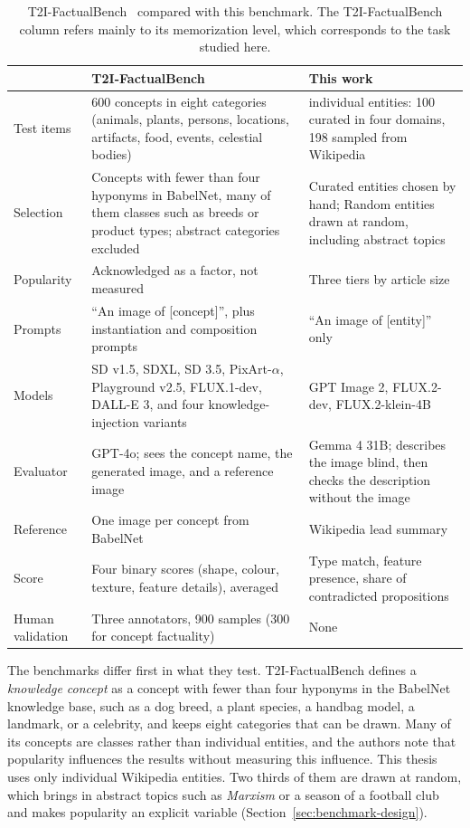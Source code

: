\begin{table}[ht]
\centering
\footnotesize
\caption{T2I-FactualBench~\citep{t2ifactualbench2025} compared with this
benchmark. The T2I-FactualBench column refers mainly to its memorization level,
which corresponds to the task studied here.}
\label{tab:t2ifactualbench}
\begin{tabular}{>{\raggedright\arraybackslash}p{2.3cm}>{\raggedright\arraybackslash}p{5.4cm}>{\raggedright\arraybackslash}p{5.4cm}}
\toprule
 & T2I-FactualBench & This work \\
\midrule
Test items & 1{,}600 concepts in eight categories (animals, plants, persons, locations, artifacts, food, events, celestial bodies) & 298 individual entities: 100 curated in four domains, 198 sampled from Wikipedia \\
Selection & Concepts with fewer than four hyponyms in BabelNet, many of them classes such as breeds or product types; abstract categories excluded & Curated entities chosen by hand; Random entities drawn at random, including abstract topics \\
Popularity & Acknowledged as a factor, not measured & Three tiers by article size \\
Prompts & ``An image of [concept]'', plus instantiation and composition prompts & ``An image of [entity]'' only \\
Models & SD v1.5, SDXL, SD 3.5, PixArt-$\alpha$, Playground v2.5, FLUX.1-dev, DALL-E 3, and four knowledge-injection variants & GPT Image 2, FLUX.2-dev, FLUX.2-klein-4B \\
Evaluator & GPT-4o; sees the concept name, the generated image, and a reference image & Gemma 4 31B; describes the image blind, then checks the description without the image \\
Reference & One image per concept from BabelNet & Wikipedia lead summary \\
Score & Four binary scores (shape, colour, texture, feature details), averaged & Type match, feature presence, share of contradicted propositions \\
Human validation & Three annotators, 900 samples (300 for concept factuality) & None \\
\bottomrule
\end{tabular}
\end{table}

The benchmarks differ first in what they test. T2I-FactualBench defines a
\emph{knowledge concept} as a concept with fewer than four hyponyms in the
BabelNet knowledge base, such as a dog breed, a plant species, a handbag model,
a landmark, or a celebrity, and keeps eight categories that can be drawn.
Many of its concepts are classes rather than individual entities, and the
authors note that popularity influences the results without measuring this
influence. This thesis uses only individual Wikipedia entities. Two thirds of
them are drawn at random, which brings in abstract topics such as
\emph{Marxism} or a season of a football club and makes popularity an explicit
variable (Section~\ref{sec:benchmark-design}).

